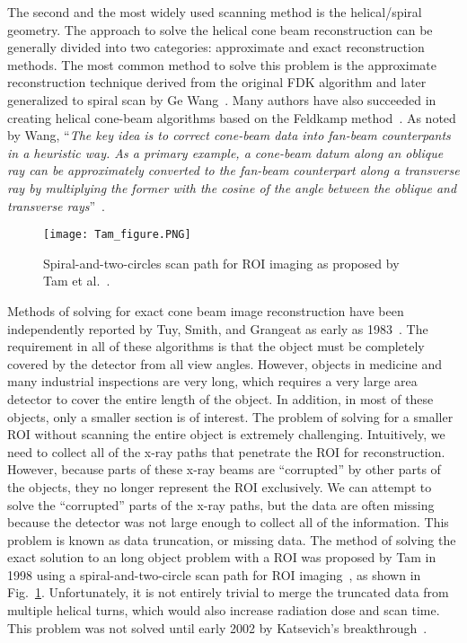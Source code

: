 The second and the most widely used scanning method is the helical/spiral geometry.  The approach to solve the helical cone beam reconstruction can be generally divided into two categories: approximate and exact reconstruction methods.  The most common method to solve this problem is the approximate reconstruction technique derived from the original FDK algorithm and later generalized to spiral scan by Ge Wang~\citep{Wang1993}.  Many authors have also succeeded in creating helical cone-beam algorithms based on the Feldkamp method~\citep{Wang1992, Kudo1991, Yan1992, Smith1992, Noo1999, Kachelriess2000, Tang2004, Tang2006a, Tang2006b}.  As noted by Wang, ``\textit{The key idea is to correct cone-beam data into fan-beam counterpants in a heuristic way.  As a primary example, a cone-beam datum along an oblique ray can be approximately converted to the fan-beam counterpart along a transverse ray by multiplying the former with the cosine of the angle between the oblique and transverse rays}''~\citep{Wang2007}.
%
\begin{figure}[h]
\texttt{[image: Tam\_figure.PNG]}
\caption{Spiral-and-two-circles scan path for ROI imaging as proposed by Tam et al.~\citep{Tam1998}.}
\label{fig:tam_circle}
\end{figure}
%
Methods of solving for exact cone beam image reconstruction have been independently reported by Tuy, Smith, and Grangeat as early as 1983~\citep{Tuy1983, Smith1985, Grangeat1991}.  The requirement in all of these algorithms is that the object must be completely covered by the detector from all view angles.  However, objects in medicine and many industrial inspections are very long, which requires a very large area detector to cover the entire length of the object.  In addition, in most of these objects, only a smaller section is of interest.  The problem of solving for a smaller ROI without scanning the entire object is extremely challenging.  Intuitively, we need to collect all of the x-ray paths that penetrate the ROI for reconstruction.  However, because parts of these x-ray beams are ``corrupted'' by other parts of the objects, they no longer represent the ROI exclusively.  We can attempt to solve the ``corrupted'' parts of the x-ray paths, but the data are often missing because the detector was not large enough to collect all of the information.  This problem is known as data truncation, or missing data.  The method of solving the exact solution to an long object problem with a ROI was proposed by Tam in 1998 using a spiral-and-two-circle scan path for ROI imaging~\citep{Tam1998}, as shown in Fig.~\ref{fig:tam_circle}.  Unfortunately, it is not entirely trivial to merge the truncated data from multiple helical turns,  which would also increase radiation dose and scan time.  This problem was not solved until early 2002 by Katsevich's breakthrough~\citep{Katsevich2002SIAM, Katsevich2003, Katsevich2004}.
